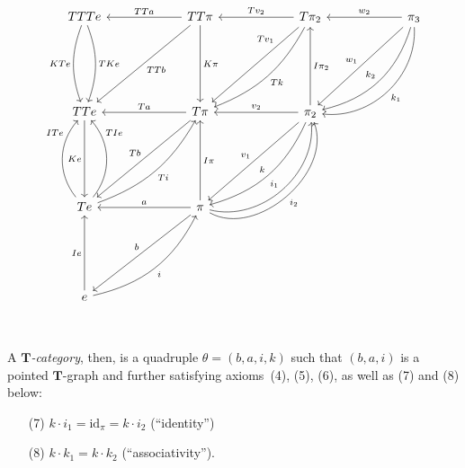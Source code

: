 \documentclass[fleqn]{article}
\newcommand{\id}{\mathrm{id}}
\newcommand{\TT}{\mathbf{T}}
\begin{document}
\begin{figure}
  \[
    \begin{tikzcd}[sep=6em]
      TTTe
        \ar[d,swap,"KTe",bend right=20]
        \ar[d,"TKe",bend left=20]
    & TT\pi
        \ar[l,swap,"TTa"]
        \ar[d,"K\pi"]
        \ar[dl,"TTb"]
    & T\pi_2
        \ar[l,swap,"Tv_2"]
        \ar[dl,swap,near start,"Tv_1"]
        \ar[dl,"Tk",bend left=20]
    & \pi_3
        \ar[l,swap,"w_2"]
        \ar[dl,swap,"w_1"]
        \ar[dl,swap,"k_2",bend left=30]
        \ar[dl,"k_1",bend left=50]
    \\TTe
        \ar[d,swap,"Ke"]
    & T\pi
        \ar[l,swap,"Ta"]
        \ar[dl,swap,"Tb"]
    & \pi_2
        \ar[l,swap,"v_2"]
        \ar[u,swap,"I\pi_2"]
        \ar[dl,swap,"v_1"]
        \ar[dl,swap,"k",bend left=25]
    \\Te
        \ar[u,near end,"ITe",bend left=40]
        \ar[u,swap,near end,"TIe",bend right=40]
        \ar[ur,swap,"Ti",bend right=20]
    & \pi
        \ar[l,swap,"a"]
        \ar[u,swap,"I\pi"]
        \ar[ur,"i_1",bend right=55]
        \ar[ur,swap,"i_2",bend right=70]
        \ar[dl,swap,"b"]
    \\e
        \ar[u,"Ie"]
        \ar[ur,swap,"i",bend right=25]
    \end{tikzcd}
  \]
  \caption{~}
  \label{fig:figure-1}
\end{figure}

A \emph{$\TT$-category}, then, is a quadruple $\theta=(b,a,i,k)$ such that $(b,a,i)$ is a pointed $\TT$-graph and further satisfying axioms~(4), (5), (6), as well as (7) and (8) below:
\begin{enumerate}
  \item[(7)] $k\cdot i_1 = \id_\pi = k\cdot i_2$ (``identity'')
  \item[(8)] $k\cdot k_1 = k\cdot k_2$ (``associativity'').
\end{enumerate}
\end{document}
